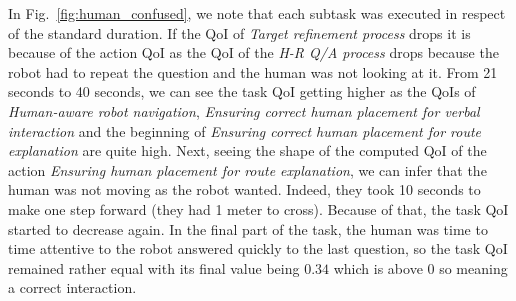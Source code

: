 \documentclass[a4paper,11pt,twoside]{StyleThese}
\begin{document}
In Fig.~\ref{fig:human_confused}, we note that each subtask was executed in respect of the standard duration. If the QoI of \textit{Target refinement process} drops it is because of the action QoI as the QoI of the \textit{H-R Q/A process} drops because the robot had to repeat the question and the human was not looking at it. From 21 seconds to 40 seconds, we can see the task QoI getting higher as the QoIs of \textit{Human-aware robot navigation}, \textit{Ensuring correct human placement for verbal interaction} and the beginning of \textit{Ensuring correct human placement for route explanation} are quite high. Next, seeing the shape of the computed QoI of the action \textit{Ensuring human placement for route explanation}, we can infer that the human was not moving as the robot wanted. Indeed, they took 10 seconds to make one step forward (they had 1 meter to cross). Because of that, the task QoI started to decrease again. In the final part of the task, the human was time to time attentive to the robot answered quickly to the last question, so the task QoI remained rather equal with its final value being $0.34$ which is above 0 so meaning a correct interaction.
\end{document}
